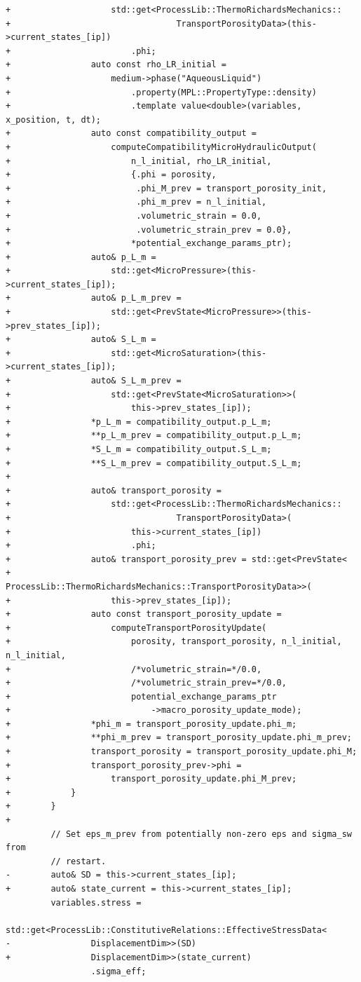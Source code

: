 \documentclass[10pt]{article}
\begin{document}
\begin{lstlisting}
+                    std::get<ProcessLib::ThermoRichardsMechanics::
+                                 TransportPorosityData>(this->current_states_[ip])
+                        .phi;
+                auto const rho_LR_initial =
+                    medium->phase("AqueousLiquid")
+                        .property(MPL::PropertyType::density)
+                        .template value<double>(variables, x_position, t, dt);
+                auto const compatibility_output =
+                    computeCompatibilityMicroHydraulicOutput(
+                        n_l_initial, rho_LR_initial,
+                        {.phi = porosity,
+                         .phi_M_prev = transport_porosity_init,
+                         .phi_m_prev = n_l_initial,
+                         .volumetric_strain = 0.0,
+                         .volumetric_strain_prev = 0.0},
+                        *potential_exchange_params_ptr);
+                auto& p_L_m =
+                    std::get<MicroPressure>(this->current_states_[ip]);
+                auto& p_L_m_prev =
+                    std::get<PrevState<MicroPressure>>(this->prev_states_[ip]);
+                auto& S_L_m =
+                    std::get<MicroSaturation>(this->current_states_[ip]);
+                auto& S_L_m_prev =
+                    std::get<PrevState<MicroSaturation>>(
+                        this->prev_states_[ip]);
+                *p_L_m = compatibility_output.p_L_m;
+                **p_L_m_prev = compatibility_output.p_L_m;
+                *S_L_m = compatibility_output.S_L_m;
+                **S_L_m_prev = compatibility_output.S_L_m;
+
+                auto& transport_porosity =
+                    std::get<ProcessLib::ThermoRichardsMechanics::
+                                 TransportPorosityData>(
+                        this->current_states_[ip])
+                        .phi;
+                auto& transport_porosity_prev = std::get<PrevState<
+                    ProcessLib::ThermoRichardsMechanics::TransportPorosityData>>(
+                    this->prev_states_[ip]);
+                auto const transport_porosity_update =
+                    computeTransportPorosityUpdate(
+                        porosity, transport_porosity, n_l_initial, n_l_initial,
+                        /*volumetric_strain=*/0.0,
+                        /*volumetric_strain_prev=*/0.0,
+                        potential_exchange_params_ptr
+                            ->macro_porosity_update_mode);
+                *phi_m = transport_porosity_update.phi_m;
+                **phi_m_prev = transport_porosity_update.phi_m_prev;
+                transport_porosity = transport_porosity_update.phi_M;
+                transport_porosity_prev->phi =
+                    transport_porosity_update.phi_M_prev;
+            }
+        }
+
         // Set eps_m_prev from potentially non-zero eps and sigma_sw from
         // restart.
-        auto& SD = this->current_states_[ip];
+        auto& state_current = this->current_states_[ip];
         variables.stress =
             std::get<ProcessLib::ConstitutiveRelations::EffectiveStressData<
-                DisplacementDim>>(SD)
+                DisplacementDim>>(state_current)
                 .sigma_eff;
 

\end{lstlisting}
\end{document}
